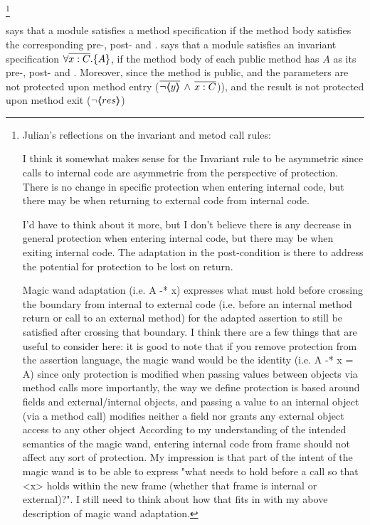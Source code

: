 \footnote{Julian's reflections on the invariant and metod call rules:

 I think it somewhat makes sense for the Invariant rule to be asymmetric since
calls to internal code are asymmetric from the perspective of protection. There is no change in specific protection when entering 
internal code, but there may be when returning to external code from internal code. 

I'd have to think about it more, but I don't believe there is any decrease in general protection when entering internal code,
but there may be when exiting internal code. The adaptation in the post-condition is there to address the potential
for protection to be lost on return.

Magic wand adaptation (i.e. A -* x) expresses what must hold before crossing the boundary from internal to external code
(i.e. before an internal method return or call to an external method) for the adapted assertion to still be satisfied after crossing 
that boundary. I think there are a few things that are useful to consider here:
it is good to note that if you remove protection from the assertion language, the magic wand would be the identity
(i.e. A -* x = A) since only protection is modified when passing values between objects via method calls
more importantly, the way we define protection is based around fields and external/internal objects, and passing a value
to an internal object (via a method call) modifies neither a field nor grants any external object access to any other object
According to my understanding of the intended semantics of the magic wand, entering internal code from frame should
not affect any sort of protection.
My impression is that part of the intent of the magic wand is to be able to express "what needs to hold before a call
so that <x>  holds within the new frame (whether that frame is internal or external)?". I still need to think about how that
fits in with my above description of magic wand adaptation.
}

%
% 
 {{} says that  a module satisfies a method specification if the method body satisfies the corresponding pre-, post- and \midcond.
 }
 {{} says that  a module satisfies an invariant specification $\forall { \overline{x:C}}.{{\{}}{A}{{\}}}$,  if the method body of each public method
 has $A$ as its  pre-, post- and \midcond. Moreover, since the method is public,  and the parameters are not protected upon method entry ($\overline{ \neg\langle\!\!\langle y \rangle\!\!\rangle}\, \wedge\, \overline{x:C}$)),
 and the result is not protected upon method exit ($ \neg\langle\!\!\langle res \rangle\!\!\rangle$)
}
 
